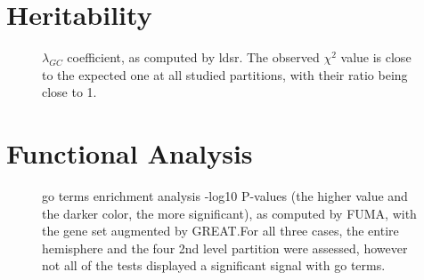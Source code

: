 \chapter{Heritability}
\begin{figure}[H]
	\centering

\caption[$\lambda_{GC}$ coefficient, as computed by LDSR]{$\lambda_{GC}$ coefficient, as computed by \ac{ldsr}. The observed $\chi^2$ value is close to the expected one at all studied partitions, with their ratio being close to 1.}	
\end{figure}
\chapter{Functional Analysis}
\begin{figure}[H]
	\centering
	\quad
	\quad
	\caption[GO terms enrichment analysis]{\Ac{go} terms enrichment analysis -log10 P-values (the higher value and the darker color, the more significant), as computed by FUMA, with the gene set augmented by GREAT.For all three cases, the entire hemisphere and the four 2nd level partition were assessed, however not all of the tests displayed a significant signal with \ac{go} terms.}
	\label{fig:go}
\end{figure}

